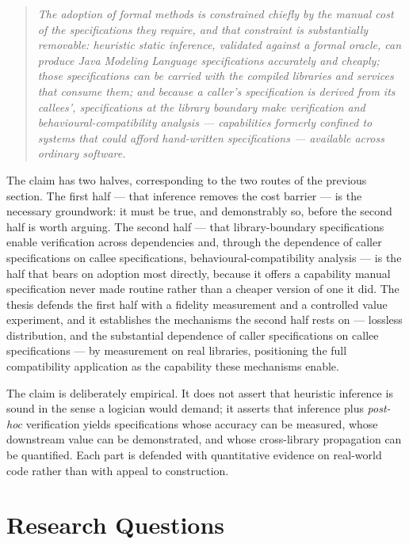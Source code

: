 \begin{quote}
\emph{The adoption of formal methods is constrained chiefly by the manual cost of
the specifications they require, and that constraint is substantially removable:
heuristic static inference, validated against a formal oracle, can produce Java
Modeling Language specifications accurately and cheaply; those specifications can
be carried with the compiled libraries and services that consume them; and
because a caller's specification is derived from its callees', specifications at
the library boundary make verification and behavioural-compatibility analysis ---
capabilities formerly confined to systems that could afford hand-written
specifications --- available across ordinary software.}
\end{quote}

The claim has two halves, corresponding to the two routes of the previous section.
The first half --- that inference removes the cost barrier --- is the necessary
groundwork: it must be true, and demonstrably so, before the second half is worth
arguing. The second half --- that library-boundary specifications enable
verification across dependencies and, through the dependence of caller
specifications on callee specifications, behavioural-compatibility analysis --- is
the half that bears on adoption most directly, because it offers a capability
manual specification never made routine rather than a cheaper version of one it
did. The thesis defends the first half with a fidelity measurement and a
controlled value experiment, and it establishes the mechanisms the second half
rests on --- lossless distribution, and the substantial dependence of caller
specifications on callee specifications --- by measurement on real libraries,
positioning the full compatibility application as the capability these mechanisms
enable.

The claim is deliberately empirical. It does not assert that heuristic
inference is sound in the sense a logician would demand; it asserts that
inference plus \emph{post-hoc} verification yields specifications whose accuracy
can be measured, whose downstream value can be demonstrated, and whose
cross-library propagation can be quantified. Each part is defended with
quantitative evidence on real-world code rather than with appeal to construction.

\section{Research Questions}

